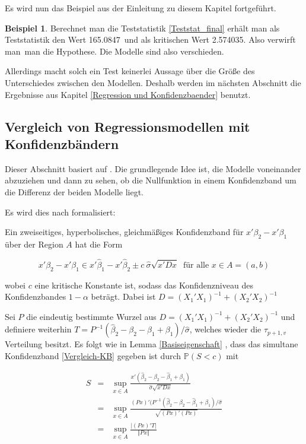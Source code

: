\documentclass[12pt,a4paper]{article}
\theoremstyle{definition}
\newtheorem{Beispiel}[Definition]{Beispiel}
\theoremstyle{definition}
\theoremstyle{definition}
\theoremstyle{definition}
\newcommand{\TestWert}{165.0847}%
\newcommand{\kritWert}{2.574035}%
\newcommand{\EntscheidungHypothesen}{verwirft man}
\newcommand{\Modellesind}{verschieden}
\begin{document}
Es wird nun das Beispiel aus der Einleitung zu diesem Kapitel fortgeführt.

\begin{Beispiel}
Berechnet man die Teststatistik \eqref{Teststat_final} erhält man als Teststatistik den Wert \TestWert ~und als kritischen Wert \kritWert . Also \EntscheidungHypothesen ~man die Hypothese. Die Modelle sind also \Modellesind .
\end{Beispiel}

Allerdings macht solch ein Test keinerlei Aussage über die Größe des Unterschiedes zwischen den Modellen. Deshalb werden im nächsten Abschnitt die Ergebnisse aus Kapitel \ref{Regression und Konfidenzbaender} benutzt.


\subsection{Vergleich von Regressionsmodellen mit Konfidenzbändern}
\label{Konfidenzbaender vergleich}
Dieser Abschnitt basiert auf \cite[119-121]{Liu64}.
Die grundlegende Idee ist, die Modelle voneinander abzuziehen und dann zu sehen, ob die Nullfunktion in einem Konfidenzband um die Differenz der beiden Modelle liegt.

Es wird dies nach \cite[122]{Liu64} formalisiert: 

Ein zweiseitiges, hyperbolisches, gleichmäßiges Konfidenzband für $x'\beta_2 - x'\beta_1$ über der Region $A$ hat die Form

\begin{equation} \label{Vergleich-KB}
x'\beta_2-x'\beta_1 \in x' \hat{\beta}_1 - x' \hat{\beta}_2 \pm c ~ \hat{\sigma} \sqrt{x' D x} ~ \text{ für alle } x \in A = (a,b)
\end{equation}

wobei $c$ eine kritische Konstante ist, sodass das Konfidenzniveau des Konfidenzbandes $1-\alpha$ beträgt. Dabei ist $D = (X_1'X_1)^{-1} + (X_2'X_2)^{-1}$

Sei $P$ die eindeutig bestimmte Wurzel aus $D = (X_1'X_1)^{-1} + (X_2'X_2)^{-1}$ und definiere weiterhin $T=P^{-1}(\hat{\beta}_2 - \beta_2 - \hat{\beta}_1 + \beta_1)/\hat{\sigma}$, welches wieder die $\tau_{p+1,v}$ Verteilung besitzt. Es folgt wie in Lemma \ref{Basiseigenschaft} , dass das simultane Konfidenzband \eqref{Vergleich-KB} gegeben ist durch $\mathbb{P}(S<c)$ mit

\begin{eqnarray*}
S &=& \sup_{x \in A} \frac{x' (\hat{\beta}_2-\beta_2-\hat{\beta}_1+\beta_1)}{\hat{\sigma}\sqrt{x' D x}}\\
&=& \sup_{x \in A} \frac{(Px)' (P^{-1} (\hat{\beta}_2-\beta_2-\hat{\beta}_1+\beta_1)/\hat{\sigma}}{\sqrt{(Px)'(Px)}} \\
&=& \sup_{x \in A} \frac{\vert (Px)' T \vert}{\Vert Px \Vert}
\end{eqnarray*}
\end{document}
